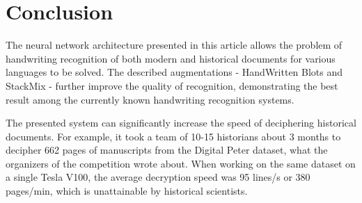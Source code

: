 \documentclass[10pt,twocolumn,letterpaper]{article}
\begin{document}
\section{Conclusion}
The neural network architecture presented in this article allows the problem of handwriting recognition of both modern and historical documents for various languages to be solved. The described augmentations - HandWritten Blots and StackMix - further improve the quality of recognition, demonstrating the best result among the currently known handwriting recognition systems.

The presented system can significantly increase the speed of deciphering historical documents. For example, it took a team of 10-15 historians about 3 months to decipher 662 pages of manuscripts from the Digital Peter dataset, what the organizers of the competition \cite{complink} wrote about. When working on the same dataset on a single Tesla V100, the average decryption speed was 95 lines/s or 380 pages/min, which is unattainable by historical scientists.



{\small


}
\end{document}
